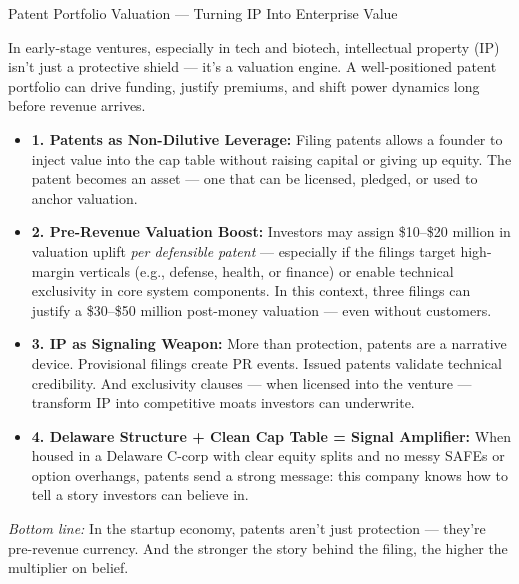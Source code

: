 \begin{TechnicalSidebar}{Patent Portfolio Valuation — Turning IP Into Enterprise Value}

  In early-stage ventures, especially in tech and biotech, intellectual property (IP) isn’t just a protective shield — 
  it’s a valuation engine. A well-positioned patent portfolio can drive funding, justify premiums, and shift power dynamics 
  long before revenue arrives.
  
  \medskip

  \begin{itemize}
  
    \item \textbf{1. Patents as Non-Dilutive Leverage:}  
    Filing patents allows a founder to inject value into the cap table without raising capital or giving up equity. The patent 
    becomes an asset — one that can be licensed, pledged, or used to anchor valuation.
    
    \item \textbf{2. Pre-Revenue Valuation Boost:}  
    Investors may assign \$10–\$20 million in valuation uplift \textit{per defensible patent} — especially if the filings 
    target high-margin verticals (e.g., defense, health, or finance) or enable technical exclusivity in core system components. 
    In this context, three filings can justify a \$30–\$50 million post-money valuation — even without customers.
    
    \item \textbf{3. IP as Signaling Weapon:}  
    More than protection, patents are a narrative device. Provisional filings create PR events. Issued patents validate technical 
    credibility. And exclusivity clauses — when licensed into the venture — transform IP into competitive moats investors can 
    underwrite.
    
    \item \textbf{4. Delaware Structure + Clean Cap Table = Signal Amplifier:}  
    When housed in a Delaware C-corp with clear equity splits and no messy SAFEs or option overhangs, patents send a strong 
    message: this company knows how to tell a story investors can believe in.

  \end{itemize}

  \medskip
  
  \textit{Bottom line:}  
  In the startup economy, patents aren’t just protection — they’re pre-revenue currency.  
  And the stronger the story behind the filing, the higher the multiplier on belief.
  
\end{TechnicalSidebar}



